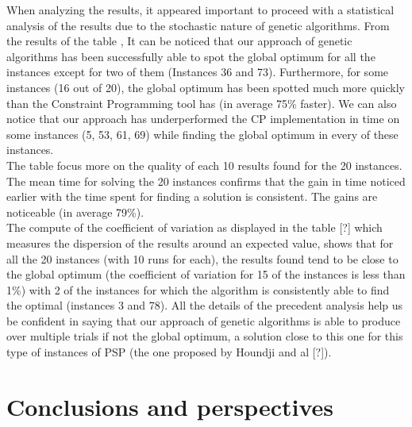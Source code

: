 \documentclass[twocolumn,10pt]{asme2ej}
\begin{document}
When analyzing the results, it appeared important to proceed with a statistical analysis of the results due to the stochastic nature of genetic algorithms. From the results of the table \cite{tab}, It can be noticed that our approach of genetic algorithms has been
successfully able to spot the global optimum for all the instances except for two of them (Instances 36 and 73). Furthermore, for some instances (16 out of 20), the global optimum has been spotted much more quickly than the Constraint Programming tool has (in average 75\% faster). We can also notice that our approach has underperformed the CP implementation in time on some instances (5, 53, 61, 69) while finding the global optimum in every of these instances.\\
The table \cite{tab:xx} focus more on the quality of each 10 results found for the 20 instances. The mean time for solving the 20 instances confirms that the gain in time noticed earlier with the time spent for finding a solution is consistent. The gains are noticeable (in average 79\%). \\
The compute of the coefficient of variation as displayed in the table [?] which measures the dispersion of the results around an expected value, shows that for all the 20 instances (with 10 runs for each), the results found tend to be close to the global optimum (the coefficient of variation for 15 of the instances is less than 1\%) with 2 of the instances for which the algorithm is consistently able to find the optimal (instances 3 and 78). 
All the details of the precedent analysis help us be confident in saying that our approach of genetic algorithms is able to produce over multiple trials if not the global optimum, a solution close to this one for this type of instances of PSP (the one proposed by Houndji and al [?]).  


\section{Conclusions and perspectives}
\end{document}

